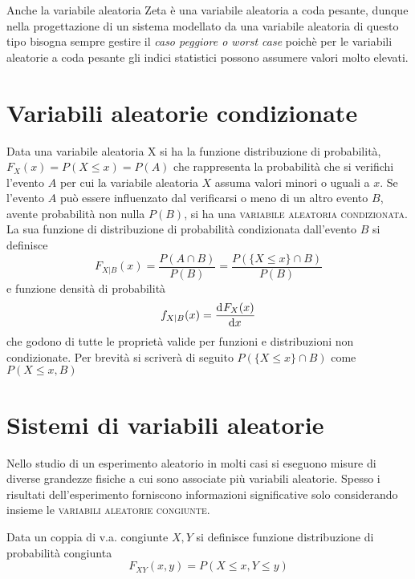 \begin{flushleft}
Anche la variabile aleatoria Zeta è una variabile aleatoria a coda pesante, dunque nella progettazione di un sistema modellato da una variabile aleatoria di questo tipo bisogna sempre gestire il \textit{caso peggiore o worst case} poichè per le variabili aleatorie a coda pesante gli indici statistici possono assumere valori molto elevati.
\end{flushleft}

\section{Variabili aleatorie condizionate}
Data una variabile aleatoria X si ha la funzione distribuzione di probabilità, $F_X(x)=P(X\leq x)=P(A)$ che rappresenta la probabilità che si verifichi l'evento $A$ per cui la variabile aleatoria $X$ assuma valori minori o uguali a $x$.
Se l'evento $A$ può essere influenzato dal verificarsi o meno di un altro evento $B$, avente probabilità non nulla $P(B)$, si ha una \textsc{variabile aleatoria condizionata}.
La sua funzione di distribuzione di probabilità condizionata dall'evento $B$ si definisce
\begin{equation}
	F_{X|B}(x)=\frac{P(A\cap B)}{P(B)}=\frac{P(\lbrace X\leq x\rbrace\cap B)}{P(B)}
\end{equation}
e funzione densità di probabilità
\[
	f_{X|B}(x)=\dfrac{\mathop{}\!\mathrm{d}^{}F_X(x)}{\mathop{}\!\mathrm{d} x^{}}
\]
che godono di tutte le proprietà valide per funzioni e distribuzioni non condizionate.
Per brevità si scriverà di seguito $P(\lbrace X\leq x\rbrace\cap B)$ come $P(X\leq x, B)$

\section{Sistemi di variabili aleatorie}
Nello studio di un esperimento aleatorio in molti casi si eseguono misure di diverse grandezze fisiche a cui sono associate più variabili aleatorie. Spesso i risultati dell'esperimento forniscono informazioni significative solo considerando insieme le \textsc{variabili aleatorie congiunte}.

Data un coppia di v.a. congiunte $X,Y$ si definisce funzione distribuzione di probabilità congiunta
\begin{equation}
\label{eq:funz_dist_prob_congiunta}
	F_{XY}(x,y)=P(X\leq x,Y\leq y)
\end{equation}

